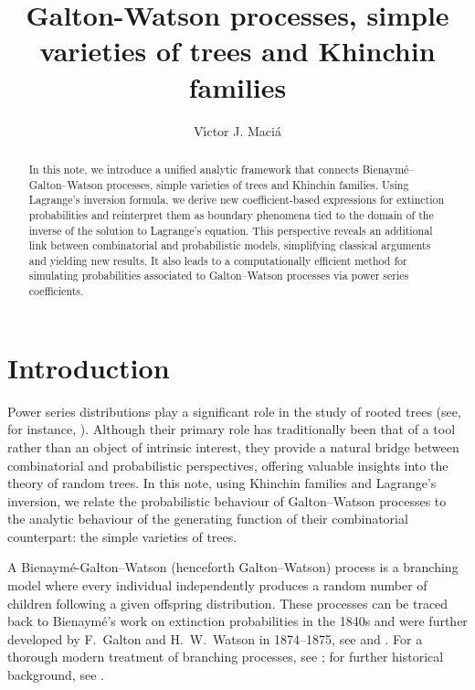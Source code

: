 \documentclass[11pt,a4paper,leqno]{amsart}
\title{Galton-Watson processes, simple varieties of trees and Khinchin families}
\author[V.\,J. Maci\'a]{V\'{\i}ctor J. Maci\'a}
\theoremstyle{plain}
\theoremstyle{definition}
\numberwithin{equation}{section}
\begin{document}
	
	
	
	\begin{abstract}
	
		
		In this note, we introduce a unified analytic framework that connects Bienaymé–Galton–Watson processes, simple varieties of trees and Khinchin families. Using Lagrange’s inversion formula, we derive new coefficient-based expressions for extinction probabilities and reinterpret them as boundary phenomena tied to the domain of the inverse of the solution to Lagrange’s equation. This perspective reveals an additional link between combinatorial and probabilistic models, simplifying classical arguments and yielding new results. It also leads to a computationally efficient method for simulating probabilities associated to Galton–Watson processes via power series coefficients. 
	\end{abstract}
	\maketitle
	
	\vspace{-.65 cm}
	\section{Introduction}

	\begingroup
\enlargethispage{-2.5\baselineskip}
		Power series distributions play a significant role in the study of rooted trees (see, for instance, \cite{Drmota_paper,Drmota, Flajolet, Janson2012,Pitman,Pitman2}). Although their primary role has traditionally been that of a tool rather than an object of intrinsic interest, they provide a natural bridge between combinatorial and probabilistic perspectives, offering valuable insights into the theory of random trees. In this note, using Khinchin families and Lagrange's inversion, we relate the probabilistic behaviour of Galton–Watson processes to the analytic behaviour of the generating function of their combinatorial counterpart: the simple varieties of trees. %
		\medskip
		
			A Bienaymé-Galton–Watson (henceforth Galton–Watson) process is a branching model where every individual independently produces a random number of children following a given offspring distribution. These processes can be traced back to Bienaymé’s work on extinction probabilities in the 1840s and were further developed by F.~Galton and H.~W.~Watson in 1874--1875, see \cite{Bienayme1845, Galton1873, GaltonWatson1875} and \cite{Watson1873}. For a thorough modern treatment of branching processes, see \cite{AthreyaNey}; for further historical background, see \cite{ Guttorp1992,Harris1963}.
			\medskip
			
\end{document}
